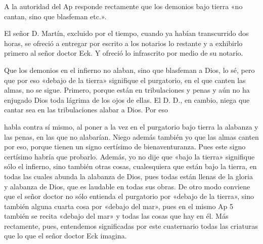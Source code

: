 A la autoridad del Ap responde rectamente que los demonios bajo tierra «no cantan, sino que blasfeman etc.».

El señor D. Martín, excluido por el tiempo, cuando ya habían transcurrido dos horas, se ofreció a entregar por escrito a los notarios lo restante y a exhibirlo primero al señor doctor Eck. Y ofreció lo infrascrito por medio de su notario.

Que los demonios en el infierno no alaban, sino que blasfeman a Dios, lo sé, pero que por eso «debajo de la tierra» signifique el purgatorio, en el que canten las almas, no se sigue. Primero, porque están en tribulaciones y penas y aún no ha enjugado Dios toda lágrima de los ojos de ellas. El D. D., en cambio, niega que cantar sea en las tribulaciones alabar a Dios. Por eso

habla contra sí mismo, al poner a la vez en el purgatorio bajo tierra la alabanza y las penas, en las que no alabarían. Niego además también yo que las almas canten por eso, porque tienen un signo certísimo de bienaventuranza. Pues este signo certísimo habría que probarlo. Además, yo no dije que «bajo la tierra» signifique sólo el infierno, sino también otras cosas, cualesquiera que están bajo la tierra, en todas las cuales abunda la alabanza de Dios, pues todas están llenas de la gloria y alabanza de Dios, que es laudable en todas sus obras. De otro modo conviene que el señor doctor no sólo entienda el purgatorio por «debajo de la tierra», sino también alguna cuarta cosa por «debajo del mar», pues en el mismo Ap 5 también se recita «debajo del mar» y todas las cosas que hay en él. Más rectamente, pues, entendemos significadas por este cuaternario todas las criaturas que lo que el señor doctor Eck imagina.

